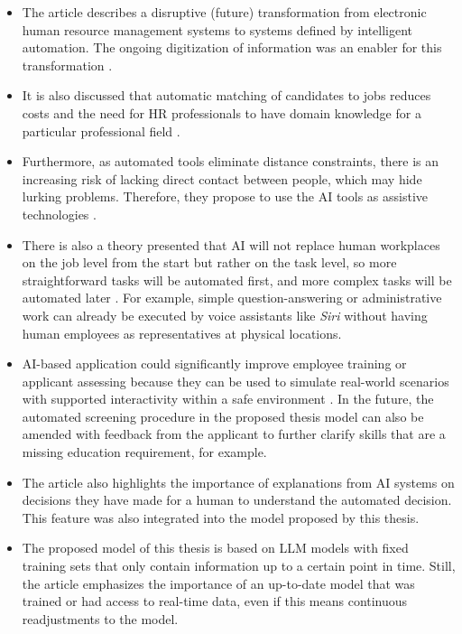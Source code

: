 \documentclass[draft,final]{thesisclass} %
\begin{document}
\begin{itemize}
    \item The article describes a disruptive (future) transformation from electronic human resource management systems to systems defined by intelligent automation. The ongoing digitization of information was an enabler for this transformation \cite[4]{ai_hrm_review}.
    \item It is also discussed that automatic matching of candidates to jobs reduces costs and the need for \acs{HR} professionals to have domain knowledge for a particular professional field \cite[10]{ai_hrm_review}.
    \item Furthermore, as automated tools eliminate distance constraints, there is an increasing risk of lacking direct contact between people, which may hide lurking problems. Therefore, they propose to use the \acs{AI} tools as assistive technologies \cite[12]{ai_hrm_review}.
    \item There is also a theory presented that \acs{AI} will not replace human workplaces on the job level from the start but rather on the task level, so more straightforward tasks will be automated first, and more complex tasks will be automated later \cite[12]{ai_hrm_review}. For example, simple question-answering or administrative work can already be executed by voice assistants like \textit{Siri} without having human employees as representatives at physical locations.
    \item \acs{AI}-based application could significantly improve employee training or applicant assessing because they can be used to simulate real-world scenarios with supported interactivity within a safe environment \cite[13]{ai_hrm_review}. In the future, the automated screening procedure in the proposed thesis model can also be amended with feedback from the applicant to further clarify skills that are a missing education requirement, for example.
    \item The article \parencite[14]{ai_hrm_review} also highlights the importance of explanations from \acs{AI} systems on decisions they have made for a human to understand the automated decision. This feature was also integrated into the model proposed by this thesis.
    \item The proposed model of this thesis is based on \gls{LLM} models with fixed training sets that only contain information up to a certain point in time. Still, the article \textcite[13]{ai_hrm_review} emphasizes the importance of an up-to-date model that was trained or had access to real-time data, even if this means continuous readjustments to the model.
\end{itemize}
\end{document}
